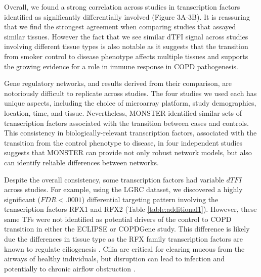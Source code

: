 Overall, we found a strong correlation across studies in transcription factors identified as significantly differentially involved (Figure 3A-3B). It is reassuring that we find the strongest agreement when comparing studies that assayed similar tissues. However the fact that we see similar dTFI signal across studies involving different tissue types is also notable as it suggests that the transition from smoker control to disease phenotype affects multiple tissues and supports the growing evidence for a role in immune response in COPD pathogenesis.

Gene regulatory networks, and results derived from their comparison, are notoriously difficult to replicate across studies\cite{sirbu2010comparison}. The four studies we used each has unique aspects, including the choice of microarray platform, study demographics, location, time, and tissue. Nevertheless, MONSTER  identified similar sets of transcription factors associated with the transition between cases and controls. This consistency in  biologically-relevant transcription factors, associated with the transition from the control phenotype to disease, in four independent studies suggests that MONSTER can provide not only robust network models, but also can identify reliable differences between networks.

Despite the overall consistency, some transcription factors had variable $dTFI$ across studies. For example, using the LGRC dataset, we discovered a highly significant ($FDR<.0001$) differential targeting pattern involving the transcription factors RFX1 and RFX2 (Table \ref{table:additional1}). However, these same TFs were not identified as potential drivers of the control to COPD transition in either the ECLIPSE or COPDGene study. This difference is likely due the differences in tissue type as the RFX family transcription factors are known to regulate ciliogenesis \cite{choksi2014switching}. Cilia are critical for clearing mucous from the airways of healthy individuals, but disruption  can lead to infection and potentially to chronic airflow obstruction \cite{hessel2014intraflagellar, hogg2004pathophysiology, fahy2010airway}. 

